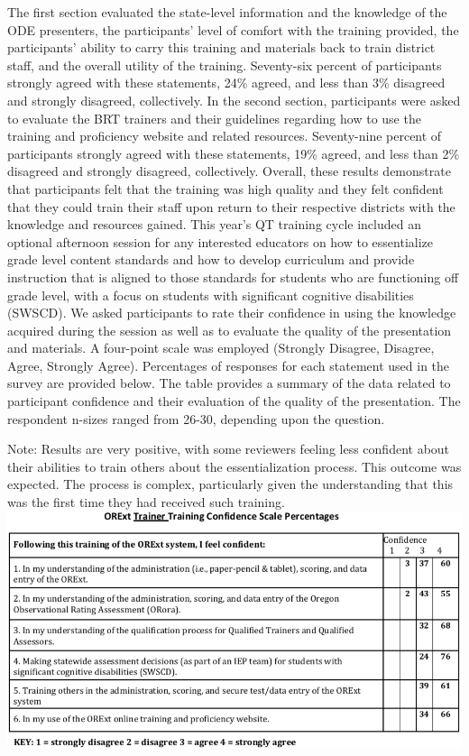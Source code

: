 \documentclass[]{article}
\begin{document}
The first section evaluated the state-level information and the
knowledge of the ODE presenters, the participants' level of comfort with
the training provided, the participants' ability to carry this training
and materials back to train district staff, and the overall utility of
the training. Seventy-six percent of participants strongly agreed with
these statements, 24\% agreed, and less than 3\% disagreed and strongly
disagreed, collectively. In the second section, participants were asked
to evaluate the BRT trainers and their guidelines regarding how to use
the training and proficiency website and related resources. Seventy-nine
percent of participants strongly agreed with these statements, 19\%
agreed, and less than 2\% disagreed and strongly disagreed,
collectively. Overall, these results demonstrate that participants felt
that the training was high quality and they felt confident that they
could train their staff upon return to their respective districts with
the knowledge and resources gained. This year's QT training cycle
included an optional afternoon session for any interested educators on
how to essentialize grade level content standards and how to develop
curriculum and provide instruction that is aligned to those standards
for students who are functioning off grade level, with a focus on
students with significant cognitive disabilities (SWSCD). We asked
participants to rate their confidence in using the knowledge acquired
during the session as well as to evaluate the quality of the
presentation and materials. A four-point scale was employed (Strongly
Disagree, Disagree, Agree, Strongly Agree). Percentages of responses for
each statement used in the survey are provided below. The table provides
a summary of the data related to participant confidence and their
evaluation of the quality of the presentation. The respondent n-sizes
ranged from 26-30, depending upon the question.

Note: Results are very positive, with some reviewers feeling less
confident about their abilities to train others about the
essentialization process. This outcome was expected. The process is
complex, particularly given the understanding that this was the first
time they had received such training. \FloatBarrier
\includegraphics{Figures/QTQAtraining/TrainingConfidenceScale.png}
\end{document}
